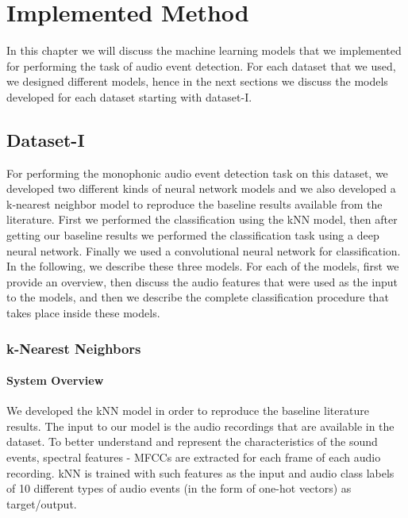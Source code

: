 \chapter{Implemented Method}
In this chapter we will discuss the machine learning models that we implemented for performing the task of audio event detection. For each dataset that we used, we designed different models, hence in the next sections we discuss the models developed for each dataset starting with dataset-I.

\section{Dataset-I}

For performing the monophonic audio event detection task on this dataset, we developed two different kinds of neural network models and we also developed a k-nearest neighbor model to reproduce the baseline results available from the literature. First we performed the classification using the kNN model, then after getting our baseline results we performed the classification task using a deep neural network. Finally we used a convolutional neural network for classification. In the following, we describe these three models. For each of the models, first we provide an overview, then discuss the audio features that were used as the input to the models, and then we describe the complete classification procedure that takes place inside these models.

\subsection{k-Nearest Neighbors}

\subsubsection{System Overview}
We developed the kNN model in order to reproduce the baseline literature results. The input to our model is the audio recordings that are available in the dataset. To better understand and represent the characteristics of the sound events, spectral features - MFCCs are extracted for each frame of each audio recording. kNN is trained with such features as the input and audio class labels of 10 different types of audio events (in the form of one-hot vectors) as target/output. 

